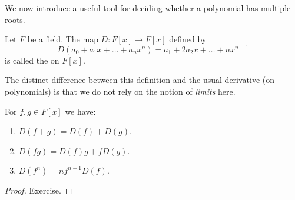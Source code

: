 We now introduce a useful tool for deciding whether a polynomial has multiple roots.

\begin{definition}
	Let $F$ be a field. The map $D: F[x] \to F[x]$ defined by
	\[
		D(a_0 + a_1 x + \dots + a_n x^n) = a_1 + 2a_2 x + \dots + nx^{n - 1}
	\]
	is called the  on $F[x]$.
\end{definition}

\begin{remark}
	The distinct difference between this definition and the usual derivative (on polynomials) is that we do not rely on the notion of \emph{limits} here.
\end{remark}

\begin{proposition}
	For $f, g \in F[x]$ we have:
	\begin{enumerate}
		\item $D(f + g) = D(f) + D(g)$.
		\item $D(fg) = D(f)g + fD(g)$.
		\item $D(f^n) = nf^{n - 1} D(f)$.
	\end{enumerate}
	\begin{proof}
		Exercise.
		\begin{comment}
		Suppose that $\deg{f} = n \leq m = \deg{g}$ and that $f = a_0 + \dots + a_n x^n$ and $g = b_0 + \dots + b_m x^m$.
		\begin{enumerate}
			\item We have
			\begin{align*}
				D(f + g) &= D((a_0 + b_0) + \dots + (a_n + b_n) x^n \\
						& \qquad + b_{n + 1}x^{n + 1} + \dots + b_m x^m) \\
					&= 2(a_1 + b_1) + \dots + n(a_n + b_n) x^{n - 1} \\
						& \qquad + (n + 1)b_{n + 1}x^n + \dots + m b_m x^{m - 1} \\
					&= 2a_1 + \dots + n a_n x^{n - 1} + 2b_1 + \dots + + m b_m x^{m - 1} \\
					&= D(f) + D(g).
			\end{align*}
			\item We have
			\begin{align*}
				D(fg) &=  \\
					&= D(f)g + fD(g).
			\end{align*}
			\item We have
			\begin{align*}
			D(f^n) &=  \\
				&= nf^{n - 1} D(f).
			\end{align*}
		\end{enumerate}
		\end{comment}
	\end{proof}
\end{proposition}

